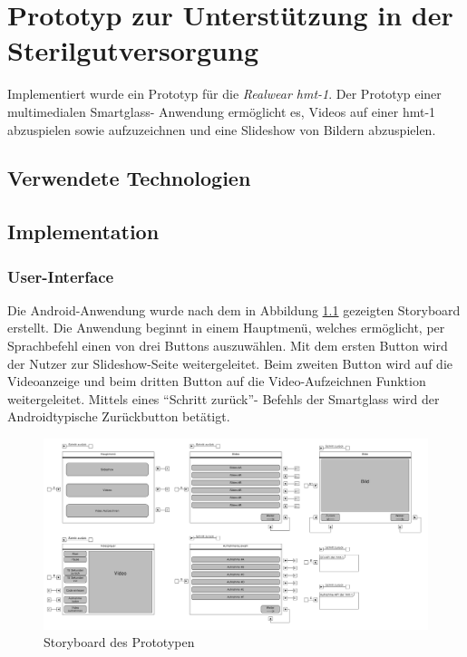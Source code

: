 %
%
%
%
%
%
\chapter{Prototyp zur Unterstützung in der Sterilgutversorgung}
\label{ch:Prototyp}
Implementiert wurde ein Prototyp für die \emph{Realwear hmt-1}. Der Prototyp einer multimedialen Smartglass- Anwendung ermöglicht es, Videos auf einer hmt-1 abzuspielen sowie aufzuzeichnen und eine Slideshow von Bildern abzuspielen. 
%
%
%
%
%
%
\section{Verwendete Technologien}
\label{sec:Verwendete_Technologien}
%
%
%
%
%
%
\section{Implementation}
\label{sec:Implementation}
%
%
%
%
%
%
\subsection{User-Interface}
Die Android-Anwendung wurde nach dem in Abbildung \ref{fig:Storyboard_des_Prototypen} gezeigten Storyboard erstellt. Die Anwendung beginnt in einem Hauptmenü, welches ermöglicht, per Sprachbefehl einen von drei Buttons auszuwählen. Mit dem ersten Button wird der Nutzer zur Slideshow-Seite weitergeleitet. Beim zweiten Button wird auf die Videoanzeige und beim dritten Button auf die Video-Aufzeichnen Funktion weitergeleitet. Mittels eines \enquote{Schritt zurück}- Befehls der Smartglass wird der Androidtypische Zurückbutton betätigt.
%
\begin{figure}[htbp]
    \centering
    \includegraphics[width=1\textwidth]{data/bilder/UI-Storyboard.pdf}
    \caption{Storyboard des Prototypen}
    \label{fig:Storyboard_des_Prototypen}
\end{figure}

